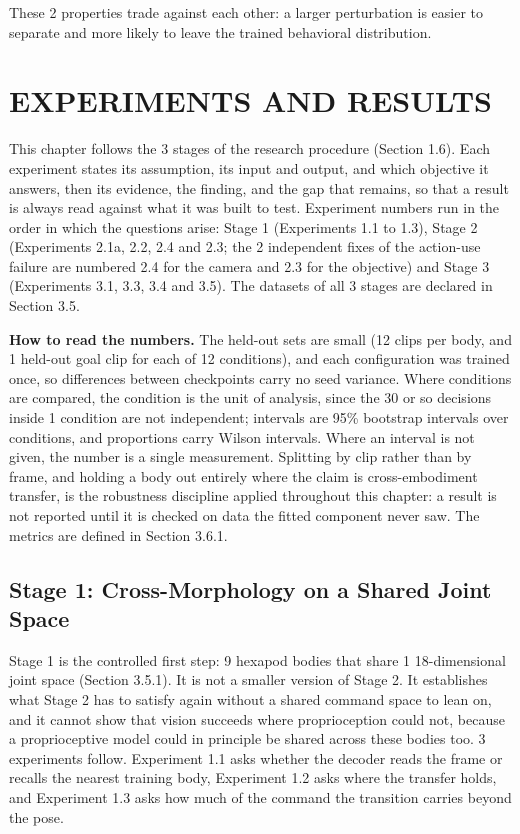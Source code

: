 \documentclass[12pt,a4paper,oneside]{report}
\begin{document}
These 2 properties trade against each other: a larger perturbation is easier to separate and more likely to
leave the trained behavioral distribution. 

\chapter{EXPERIMENTS AND RESULTS}

This chapter follows the 3 stages of the research procedure (Section 1.6). Each experiment states its assumption, its input and output, and which objective it answers, then its evidence, the finding, and the gap that remains, so that a result is always read against what it was built to test. Experiment numbers run in the order in which the questions arise: Stage 1 (Experiments 1.1 to 1.3), Stage 2 (Experiments 2.1a, 2.2, 2.4 and 2.3; the 2 independent fixes of the action-use failure are numbered 2.4 for the camera and 2.3 for the objective) and Stage 3 (Experiments 3.1, 3.3, 3.4 and 3.5). The datasets of all 3 stages are declared in Section 3.5.

\noindent\textbf{How to read the numbers.} The held-out sets are small (12 clips per body, and 1 held-out goal clip for each of 12 conditions), and each configuration was trained once, so differences between checkpoints carry no seed variance. Where conditions are compared, the condition is the unit of analysis, since the 30 or so decisions inside 1 condition are not independent; intervals are 95\% bootstrap intervals over conditions, and proportions carry Wilson intervals. Where an interval is not given, the number is a single measurement. Splitting by clip rather than by frame, and holding a body out entirely where the claim is cross-embodiment transfer, is the robustness discipline applied throughout this chapter: a result is not reported until it is checked on data the fitted component never saw. The metrics are defined in Section 3.6.1.

\section{Stage 1: Cross-Morphology on a Shared Joint Space}
Stage 1 is the controlled first step: 9 hexapod bodies that share 1 18-dimensional joint space (Section 3.5.1). It is not a smaller version of Stage 2. It establishes what Stage 2 has to satisfy again without a shared command space to lean on, and it cannot show that vision succeeds where proprioception could not, because a proprioceptive model could in principle be shared across these bodies too. 3 experiments follow. Experiment 1.1 asks whether the decoder reads the frame or recalls the nearest training body, Experiment 1.2 asks where the transfer holds, and Experiment 1.3 asks how much of the command the transition carries beyond the pose.
\end{document}
